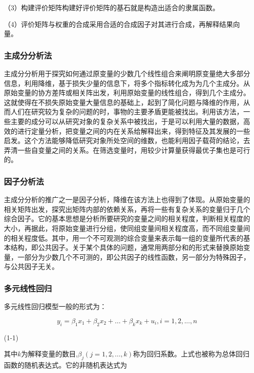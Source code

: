\documentclass[UTF8,a4paper,12pt]{ctexart}  %
\begin{document}
（3）构建评价矩阵构建好评价矩阵的基石就是构造出适合的隶属函数。

（4）评价矩阵与权重的合成采用合适的合成因子对其进行合成，再解释结果向量。

\hypertarget{section-8}{%
\subsubsection{主成分分析法}\label{section-8}}

主成分分析用于探究如何通过原变量的少数几个线性组合来阐明原变量绝大多部分信息，利用降维，基于损失少量的信息下，将多个指标转化成为为几个主成分。从原始变量的协方差阵或相关阵出发，利用原始变量的线性组合，得到几个主成分。这就使得在不损失原始变量大量信息的基础上，起到了简化问题与降维的作用，从而人们在研究较为复杂的问题的时，事物的主要矛盾更能被找出。利用该方法，一些主要的成分可以从研究对象的复杂关系中被找出，于是可以利用大量的数据，高效的进行定量分析，把变量之间的内在关系给解释出来，得到特征及其发展的一些启发。这个方法能够降低研究对象所处空间的维数，也能利用因子载荷的结论，去弄清一些自变量之间的关系。在筛选变量时，用较少计算量获得最优子集也是可行的\citep{王静2020}。

\hypertarget{section-9}{%
\subsubsection{因子分析法}\label{section-9}}

主成分分析的推广之一是因子分析，降维在该方法上也得到了体现。从原始变量的相关矩阵出发，探究出矩阵内部的依赖关系，再将一些有复杂关系的变量归于几个综合因子。它的基本思想是分析所要研究的变量之间的相关程度，判断相关程度的大小，再据此，将原始变量进行分组，使同组变量间相关程度高，而不同组变量间的相关程度低。其中，用一个不可观测的综合变量来表示每一组的变量所代表的基本结构，即公共因子。关于某个具体的问题，通常用两部分和的形式来替换原始变量，一部分为少数几个不可测的，即公共因子的线性函数，另一部分为特殊因子，与公共因子无关。

\hypertarget{section-10}{%
\subsubsection{多元线性回归}\label{section-10}}

多元线性回归模型一般的形式为：

\[y_{i}=\beta_{1}x_{1}+\beta_{2}x_{2}+...+\beta_{k}x_{k}+u_{i},i=1,2,...,n\]

(1-1)

其中\(k\)为解释变量的数目,\(\beta_{j}(j=1,2,...,k)\)称为回归系数。上式也被称为总体回归函数的随机表达式。它的非随机表达式为
\end{document}
